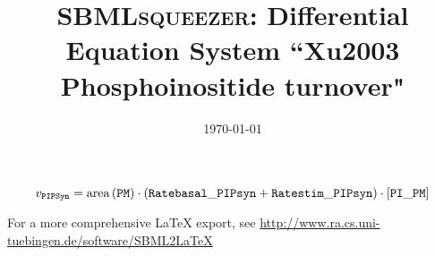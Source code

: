 \documentclass[11pt,a4paper]{scrartcl}
\title{\textsc{SBMLsqueezer}: Differential Equation System ``Xu2003 Phosphoinositide turnover"}
\date{\today}
\begin{document}
\author{}
\maketitle
\begin{equation*}
v_\mathtt{PIPSyn}= \mathrm{area}\left(\mathtt{PM}\right)\cdot\left(\mathtt{Ratebasal\-\_PIPsyn}+\mathtt{Ratestim\-\_PIPsyn}\right)\cdot [\mathtt{PI\-\_PM}]
\end{equation*}
\begin{center} For a more comprehensive \LaTeX{} export, see \url{http://www.ra.cs.uni-tuebingen.de/software/SBML2LaTeX}\end{center}
\end{document}
